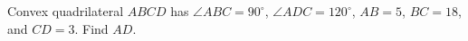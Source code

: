 Convex quadrilateral $ABCD$ has $\angle ABC=90^\circ$, $\angle ADC=120^\circ$, $AB=5$, $BC=18$, and $CD=3$. Find $AD$.
